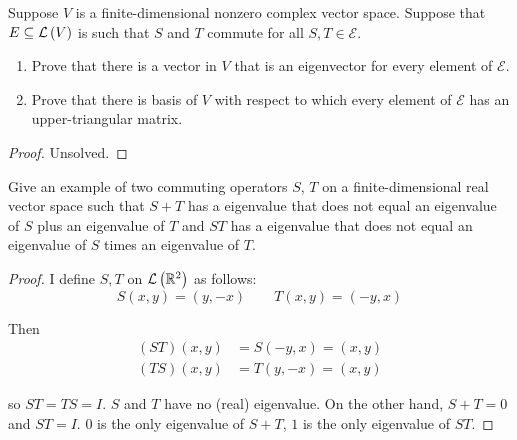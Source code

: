 \begin{exercise}\label{chapter5:sectionE:exercise9}
    Suppose $V$ is a finite-dimensional nonzero complex vector space. Suppose that $E \subseteq \mathcal{L}\left({V}\right)$ is such that $S$ and $T$ commute for all $S, T\in \mathcal{E}$.
    \begin{enumerate}[label={(\alph*)}]
        \item Prove that there is a vector in $V$ that is an eigenvector for every element of $\mathcal{E}$.
        \item Prove that there is basis of $V$ with respect to which every element of $\mathcal{E}$ has an upper-triangular matrix.
    \end{enumerate}
\end{exercise}

\begin{proof}
    Unsolved.
\end{proof}
\newpage

\begin{exercise}
    Give an example of two commuting operators $S$, $T$ on a finite-dimensional real vector space such that $S + T$ has a eigenvalue that does not equal an eigenvalue of $S$ plus an eigenvalue of $T$ and $ST$ has a eigenvalue that does not equal an eigenvalue of $S$ times an eigenvalue of $T$.
\end{exercise}

\begin{proof}
    I define $S, T$ on $\mathcal{L}\left({\mathbb{R}^{2}}\right)$ as follows:
    \[
        S(x, y) = (y, -x)\qquad T(x, y) = (-y, x)
    \]

    Then
    \begin{align*}
        (ST)(x, y) & = S(-y, x) = (x, y) \\
        (TS)(x, y) & = T(y, -x) = (x, y)
    \end{align*}

    so $ST = TS = I$. $S$ and $T$ have no (real) eigenvalue. On the other hand, $S + T = 0$ and $ST = I$. $0$ is the only eigenvalue of $S + T$, $1$ is the only eigenvalue of $ST$.
\end{proof}
\newpage
